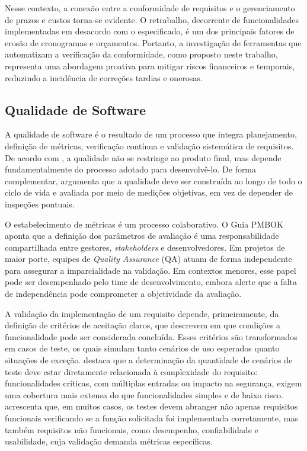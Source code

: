 Nesse contexto, a conexão entre a conformidade de requisitos e o gerenciamento de prazos e custos torna-se evidente. O retrabalho, decorrente de funcionalidades implementadas em desacordo com o especificado, é um dos principais fatores de erosão de cronogramas e orçamentos. Portanto, a investigação de ferramentas que automatizam a verificação da conformidade, como proposto neste trabalho, representa uma abordagem proativa para mitigar riscos financeiros e temporais, reduzindo a incidência de correções tardias e onerosas.

\subsection{Qualidade de Software}

A qualidade de software é o resultado de um processo que integra planejamento, definição de métricas, verificação contínua e validação sistemática de requisitos. De acordo com , a qualidade não se restringe ao produto final, mas depende fundamentalmente do processo adotado para desenvolvê-lo. De forma complementar,  argumenta que a qualidade deve ser construída ao longo de todo o ciclo de vida e avaliada por meio de medições objetivas, em vez de depender de inspeções pontuais.


O estabelecimento de métricas é um processo colaborativo. O Guia PMBOK \cite{pmi2008} aponta que a definição dos parâmetros de avaliação é uma responsabilidade compartilhada entre gestores, \textit{stakeholders} e desenvolvedores. Em projetos de maior porte, equipes de \textit{Quality Assurance} (QA) atuam de forma independente para assegurar a imparcialidade na validação. Em contextos menores, esse papel pode ser desempenhado pelo time de desenvolvimento,  embora  alerte que a falta de independência pode comprometer a objetividade da avaliação.

A validação da implementação de um requisito depende, primeiramente, da definição de critérios de aceitação claros, que descrevem em que condições a funcionalidade pode ser considerada concluída. Esses critérios são transformados em casos de teste, os quais simulam tanto cenários de uso esperados quanto situações de exceção. destaca que a determinação da quantidade de cenários de teste deve estar diretamente relacionada à complexidade do requisito: funcionalidades críticas, com múltiplas entradas ou impacto na segurança, exigem uma cobertura mais extensa do que funcionalidades simples e de baixo risco.  acrescenta que, em muitos casos, os testes devem abranger não apenas requisitos funcionais verificando se a função solicitada foi implementada corretamente, mas também requisitos não funcionais, como desempenho, confiabilidade e usabilidade, cuja validação demanda métricas específicas.

